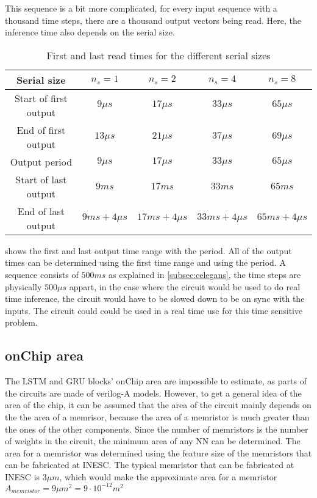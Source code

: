 This sequence is a bit more complicated, for every input sequence with a thousand time steps, there are a thousand output vectors being read. Here, the inference time also depends on the serial size.

\begin{table}[H]
  \centering
  \begin{tabular}{|c|c|c|c|c|}
    \hline
    \rowcolor{gray}
    Serial size & $n_s=1$ & $n_s=2$ & $n_s=4$ & $n_s=8$\\
    \hline
    Start of first output & $9\mu s$ & $17\mu s$ & $33\mu s$ & $65\mu s$\\
    \hline
    End of first output & $13\mu s$ & $21\mu s$ & $37\mu s$ & $69\mu s$\\
    \hline
    Output period & $9\mu s$ & $17\mu s$ & $33\mu s$ & $65\mu s$\\
    \hline
    Start of last output & $9ms$ & $17ms$ & $33ms$ & $65ms$\\
    \hline
    End of last output & $9ms +4\mu s$ & $17ms+4\mu s$ & $33ms+4\mu s$ & $65ms+4\mu s$\\
    \hline
  \end{tabular}
  \caption{First and last read times for the different serial sizes}
  \label{tab:readTimesCelegans}
\end{table}

 shows the first and last output time range with the period. All of the output times can be determined using the first time range and using the period. A sequence consists of $500ms$ as explained in \cref{subsec:celegans}, the time steps are physically $500\mu s$ appart, in the case where the circuit would be used to do real time inference, the circuit would have to be slowed down to be on sync with the inputs. The circuit could could be used in a real time use for this time sensitive problem.

\subsection{onChip area}\label{subsec:area}

The \ac{LSTM} and \ac{GRU} blocks' onChip area are impossible to estimate, as parts of the circuits are made of verilog-A models. However, to get a general idea of the area of the chip, it can be assumed that the area of the circuit mainly depends on the the area of a memrisor, because the area of a memristor is much greater than the ones of the other components. Since the number of memristors is the number of weights in the circuit, the minimum area of any \ac{NN} can be determined. The area for a memristor was determined using the feature size of the memristors that can be fabricated at \ac{INESC}. The typical memristor that can be fabricated at \ac{INESC} is $3\mu m$, which would make the approximate area for a memristor $A_{memristor}=9\mu m^2=9\cdot 10^{-12} m^2$

